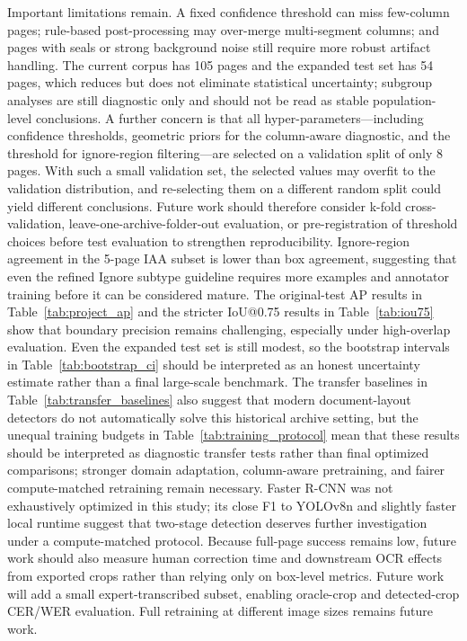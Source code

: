 \documentclass[12pt]{article}
\begin{document}
Important limitations remain. A fixed confidence threshold can miss few-column pages; rule-based post-processing may over-merge multi-segment columns; and pages with seals or strong background noise still require more robust artifact handling. The current corpus has 105 pages and the expanded test set has 54 pages, which reduces but does not eliminate statistical uncertainty; subgroup analyses are still diagnostic only and should not be read as stable population-level conclusions. A further concern is that all hyper-parameters---including confidence thresholds, geometric priors for the column-aware diagnostic, and the threshold for ignore-region filtering---are selected on a validation split of only 8 pages. With such a small validation set, the selected values may overfit to the validation distribution, and re-selecting them on a different random split could yield different conclusions. Future work should therefore consider k-fold cross-validation, leave-one-archive-folder-out evaluation, or pre-registration of threshold choices before test evaluation to strengthen reproducibility. Ignore-region agreement in the 5-page IAA subset is lower than box agreement, suggesting that even the refined Ignore subtype guideline requires more examples and annotator training before it can be considered mature. The original-test AP results in Table~\ref{tab:project_ap} and the stricter IoU@0.75 results in Table~\ref{tab:iou75} show that boundary precision remains challenging, especially under high-overlap evaluation. Even the expanded test set is still modest, so the bootstrap intervals in Table~\ref{tab:bootstrap_ci} should be interpreted as an honest uncertainty estimate rather than a final large-scale benchmark. The transfer baselines in Table~\ref{tab:transfer_baselines} also suggest that modern document-layout detectors do not automatically solve this historical archive setting, but the unequal training budgets in Table~\ref{tab:training_protocol} mean that these results should be interpreted as diagnostic transfer tests rather than final optimized comparisons; stronger domain adaptation, column-aware pretraining, and fairer compute-matched retraining remain necessary. Faster R-CNN was not exhaustively optimized in this study; its close F1 to YOLOv8n and slightly faster local runtime suggest that two-stage detection deserves further investigation under a compute-matched protocol. Because full-page success remains low, future work should also measure human correction time and downstream OCR effects from exported crops rather than relying only on box-level metrics. Future work will add a small expert-transcribed subset, enabling oracle-crop and detected-crop CER/WER evaluation. Full retraining at different image sizes remains future work.
\end{document}
